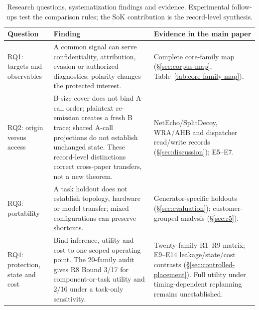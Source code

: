 \begin{table}[t]\centering\footnotesize
\caption{Research questions, systematization findings and evidence. Experimental follow-ups test the comparison rules; the SoK contribution is the record-level synthesis.}\label{tab:rq-findings}
\begin{tabularx}{\textwidth}{@{}p{}YY@{}}\toprule
Question & Finding & Evidence in the main paper\\\midrule
RQ1: targets and observables & A common signal can serve confidentiality, attribution, evasion or authorized diagnostics; polarity changes the protected interest. & Complete core-family map (\S\ref{sec:corpus-map}, Table~\ref{tab:core-family-map}).\\
RQ2: origin versus access & B-size cover does not bind A-call order; plaintext re-emission creates a fresh B trace; shared A-call projections do not establish unchanged state. These record-level distinctions correct cross-paper transfers, not a new theorem. & NetEcho/SplitDecoy, WRA/AHB and dispatcher read/write records (\S\ref{sec:discussion}); E5--E7.\\
RQ3: portability & A task holdout does not establish topology, hardware or model transfer; mixed configurations can preserve shortcuts. & Generator-specific holdouts (\S\ref{sec:evaluation}); customer-grouped analysis (\S\ref{sec:r5}).\\
RQ4: protection, state and cost & Bind inference, utility and cost to one scoped operating point. The 20-family audit gives R8 Bound 3/17 for component-or-task utility and 2/16 under a task-only sensitivity. & Twenty-family R1--R9 matrix; E9--E14 leakage/state/cost contrasts (\S\ref{sec:controlled-placement}). Full utility under timing-dependent replanning remains unestablished.\\\bottomrule
\end{tabularx}\end{table}
